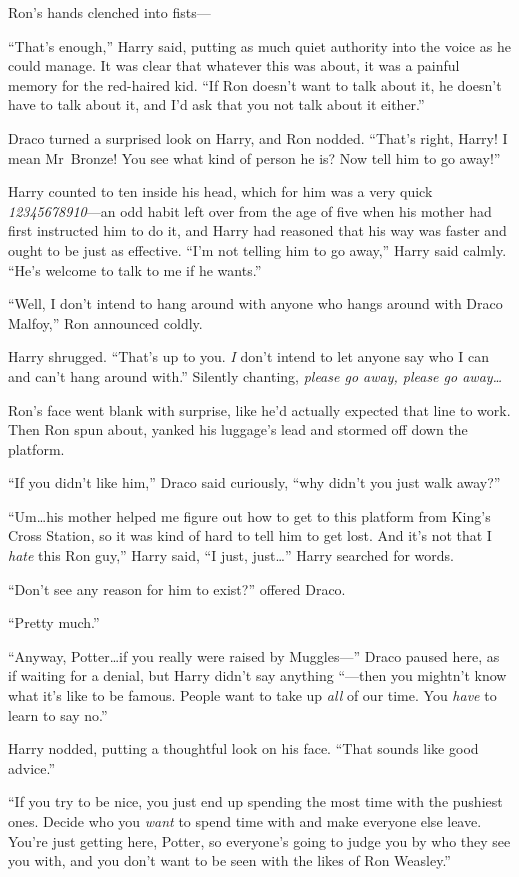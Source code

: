 Ron’s hands clenched into fists—

“That’s enough,” Harry said, putting as much quiet authority into the voice as he could manage. It was clear that whatever this was about, it was a painful memory for the red-haired kid. “If Ron doesn’t want to talk about it, he doesn’t have to talk about it, and I’d ask that you not talk about it either.”

Draco turned a surprised look on Harry, and Ron nodded. “That’s right, Harry! I mean Mr~Bronze! You see what kind of person he is? Now tell him to go away!”

Harry counted to ten inside his head, which for him was a very quick \emph{12345678910}—an odd habit left over from the age of five when his mother had first instructed him to do it, and Harry had reasoned that his way was faster and ought to be just as effective. “I’m not telling him to go away,” Harry said calmly. “He’s welcome to talk to me if he wants.”

“Well, I don’t intend to hang around with anyone who hangs around with Draco Malfoy,” Ron announced coldly.

Harry shrugged. “That’s up to you. \emph{I} don’t intend to let anyone say who I can and can’t hang around with.” Silently chanting, \emph{please go away, please go away…}

Ron’s face went blank with surprise, like he’d actually expected that line to work. Then Ron spun about, yanked his luggage’s lead and stormed off down the platform.

“If you didn’t like him,” Draco said curiously, “why didn’t you just walk away?”

“Um…his mother helped me figure out how to get to this platform from King’s Cross Station, so it was kind of hard to tell him to get lost. And it’s not that I \emph{hate} this Ron guy,” Harry said, “I just, just…” Harry searched for words.

“Don’t see any reason for him to exist?” offered Draco.

“Pretty much.”

“Anyway, Potter…if you really were raised by Muggles—” Draco paused here, as if waiting for a denial, but Harry didn’t say anything “—then you mightn’t know what it’s like to be famous. People want to take up \emph{all} of our time. You \emph{have} to learn to say no.”

Harry nodded, putting a thoughtful look on his face. “That sounds like good advice.”

“If you try to be nice, you just end up spending the most time with the pushiest ones. Decide who you \emph{want} to spend time with and make everyone else leave. You’re just getting here, Potter, so everyone’s going to judge you by who they see you with, and you don’t want to be seen with the likes of Ron Weasley.”

